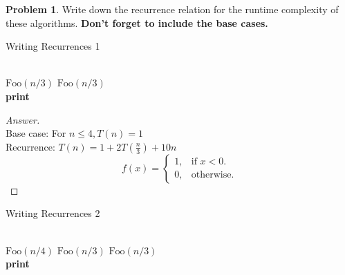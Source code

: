 \documentclass[11pt]{article}
\theoremstyle{definition}
\theoremstyle{definition}
\newtheorem{required}{Problem}
\theoremstyle{definition}
\begin{document}
\begin{required} \label{Recursive1}
Write down the recurrence relation for the runtime complexity of these algorithms. \textbf{Don't forget to include the base cases.}

\begin{algorithm}
\caption{Writing Recurrences 1}\label{alg:Recurrence1}
\begin{algorithmic}[1]
\Return
\EndIf

\noindent \\
\State $\text{Foo}(n/3)$
\State $\text{Foo}(n/3)$ \\

	\State \textbf{print} 
\EndFor
\EndProcedure
\end{algorithmic}
\end{algorithm}

\begin{proof}[Answer] $ $ \\
Base case: For $n \leq 4, T(n) = 1$ \\
Recurrence: $T(n) = 1 + 2T(\frac{n}{3}) + 10n$
\begin{equation}
  f(x)=\begin{cases}
    1, & \text{if $x<0$}.\\
    0, & \text{otherwise}.
  \end{cases}
\end{equation}
\end{proof}


\begin{comment}
\begin{align*}
T(n) &= \begin{cases}
5 & : \text{if } n \geq 0, \\
7 & : \text{if } n < 0.
\end{cases}
\end{align*}
\end{comment}




\newpage



\begin{algorithm}
\caption{Writing Recurrences 2}\label{alg:Recurrence2}
\begin{algorithmic}[1]
\Return
\EndIf

\noindent \\
\State $\text{Foo}(n/4)$
\State $\text{Foo}(n/3)$
\State $\text{Foo}(n/3)$ \\

	\State \textbf{print} 
\EndFor
\EndProcedure
\end{algorithmic}
\end{algorithm}
\end{required}
\end{document}
